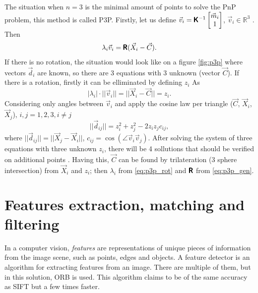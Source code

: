 The situation when $n=3$ is the minimal amount of points to solve the PnP problem, this method is called P3P.  
Firstly, let us define $\vec{v}_i = \pmb{\mathsf{K}}^{-1}\begin{bmatrix}\vec{m}_i \\ 1 \end{bmatrix}$, $\vec{v}_i \in \mathbb{R}^3$ . Then
\begin{equation}
    \label{eq:p3p_gen}
    \lambda_i \vec{v}_i = \pmb{\mathsf{R}} (\vec{X}_i - \vec{C}).
\end{equation}
If there is no rotation, the situation would look like on a figure \autoref{fig:p3p} where vectors $\vec{d}_i$ are known, so there are 3 equations with 3 unknown (vector $\vec{C}$).
If there is a rotation, firstly it can be elliminated by defining $z_i$ As
\begin{equation}
    \label{eq:p3p_rot}
    |\lambda_i| \cdot ||\vec{v}_i|| = || \vec{X}_i - \vec{C} || = z_i.
\end{equation}
Considering only angles between $\vec{v}_i$ and apply the cosine law per triangle ($\vec{C}$, $\vec{X}_i$, $\vec{X}_j$), $i, j = 1, 2, 3, i \neq j$
\begin{equation}
    ||\vec{d}_{ij}|| = z_i^2 + z_j^2 - 2z_iz_jc_{ij},
\end{equation}
where $||\vec{d}_{ij}|| = || \vec{X}_j - \vec{X}_i ||$, $c_{ij} = \cos(\angle \vec{v}_i \vec{v}_j)$.
After solving the system of three equations with three unknown $z_i$, there will be 4 sollutions that should be verified on additional points \cite{Fischler1981}.
Having this, $\vec{C}$ can be found by trilateration (3 sphere intersection) from $\vec{X}_i$ and $z_i$; then $\lambda_i$ from \eqref{eq:p3p_rot} and $\pmb{\mathsf{R}}$ from \eqref{eq:p3p_gen}.

\section{Features extraction, matching and filtering}

In a computer vision, \textit{features} are representations of unique pieces of information from the image scene, such as points, edges and objects.
A feature detector is an algorithm for extracting features from an image.
There are multiple of them, but in this solution, ORB \cite{Rublee2011} is used. 
This algorithm claims to be of the same accuracy as SIFT but a few times faster. 


